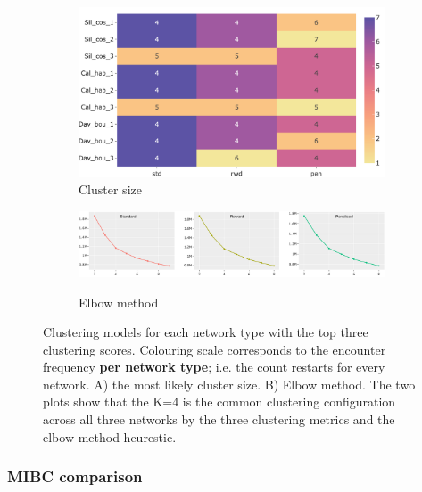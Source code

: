 \begin{figure}[!t]
    \centering
    \begin{subfigure}[!t]{0.8\textwidth}
        \includegraphics[width=\textwidth,keepaspectratio]{Sections/Network_I/Resources/P0/clustering/top3_cs_size_p0_tum4K_50TF_v3.png}
        \caption{Cluster size}
        \label{fig:N_I:p0_metr_size}
    \end{subfigure}
    \begin{subfigure}[!t]{1.0\textwidth}
        \includegraphics[width=\textwidth, keepaspectratio]{Sections/Network_I/Resources/P0/clustering/p0_elbowMethod_4K_v3.png}
        \label{fig:N_I:p0_elbow_method}
        \caption{Elbow method}
    \end{subfigure}
    \caption[Choosing $K$ for MEVs for P0 network]{Clustering models for each network type with the top three clustering scores. Colouring scale corresponds to the encounter frequency \textbf{per network type}; i.e. the count restarts for every network. A) the most likely cluster size. B) Elbow method. The two plots show that the K=4 is the common clustering configuration across all three networks by the three clustering metrics and the elbow method heurestic. }
    \label{fig:N_I:p0_top_3_metrics_II}
\end{figure}

\subsubsection*{MIBC comparison}


